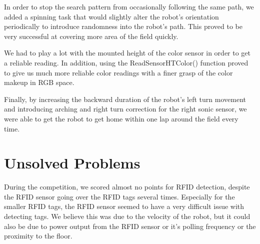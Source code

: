 \documentclass[journal]{IEEEtran}
\begin{document}
In order to stop the search pattern from occasionally following the same path, we added a spinning task that would slightly alter the robot's orientation periodically to introduce randomness into the robot's path. This proved to be very successful at covering more area of the field quickly.

We had to play a lot with the mounted height of the color sensor in order to get a reliable reading. In addition, using the ReadSensorHTColor() function proved to give us much more reliable color readings with a finer grasp of the color makeup in RGB space.

Finally, by increasing the backward duration of the robot's left turn movement and introducing arching and right turn correction for the right sonic sensor, we were able to get the robot to get home within one lap around the field every time.

\section{Unsolved Problems}\label{S.unsolved}
During the competition, we scored almost no points for RFID detection, despite the RFID sensor going over the RFID tags several times. Especially for the smaller RFID tags, the RFID sensor seemed to have a very difficult issue with detecting tags. We believe this was due to the velocity of the robot, but it could also be due to power output from the RFID sensor or it's polling frequency or the proximity to the floor.
\end{document}

